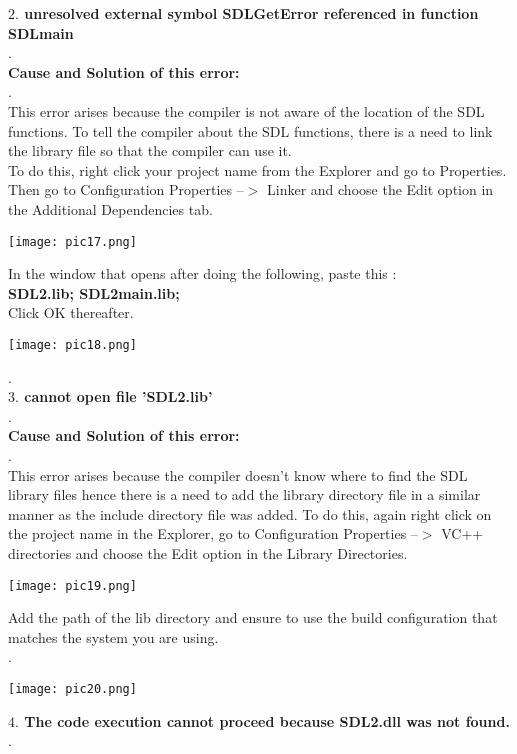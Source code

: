\documentclass{article}
\begin{document}
\begin{flushleft}
		\textbf{$ 2. $ unresolved external symbol SDLGetError referenced in function SDLmain} \\
		.\\
		\textbf{Cause and Solution of this error:}\\.\\
		This error arises because the compiler is not aware of the location of the SDL functions. To tell the compiler about the SDL functions, there is a need to link the library file so that the compiler can use it. \\
		To do this, right click your project name from the Explorer and go to Properties. Then go to Configuration Properties --$ > $ Linker and choose the Edit option in the Additional Dependencies tab. \\
		\begin{center}
			\texttt{[image: pic17.png]}
		\end{center}
		In the window that opens after doing the following, paste this : \\ 
		\textbf{SDL2.lib; SDL2main.lib;} \\
		Click OK thereafter. \\
		\begin{center}
			\texttt{[image: pic18.png]}
		\end{center}
		.\\
		\textbf{$ 3. $ cannot open file 'SDL2.lib'} \\.\\
		\textbf{Cause and Solution of this error:}\\.\\
		This error arises because the compiler doesn't know where to find the SDL library files hence there is a need to add the library directory file in a similar manner as the include directory file was added. 
		To do this, again right click on the project name in the Explorer, go to Configuration Properties --$ > $ VC++ directories and choose the Edit option in the Library Directories. 
		\begin{center}
			\texttt{[image: pic19.png]}
		\end{center}
		Add the path of the lib directory and ensure to use the build configuration that matches the system you are using.\\ .\\
		\begin{center}
			\texttt{[image: pic20.png]}
		\end{center}
		\textbf{$ 4. $ The code execution cannot proceed because SDL2.dll was not found.}\\.\\

\end{flushleft}
\end{document}

